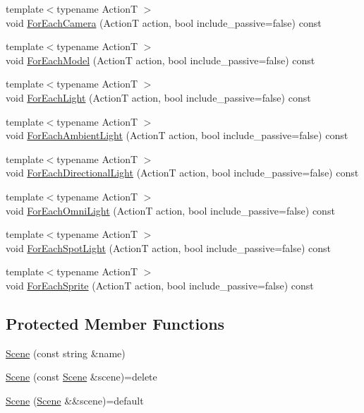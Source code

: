 \begin{DoxyCompactItemize}
\item 
{\footnotesize template$<$typename ActionT $>$ }\\void \hyperlink{classmage_1_1_scene_a196159c991332f06faaee3c6ce0ff780}{For\+Each\+Camera} (ActionT action, bool include\+\_\+passive=false) const
\item 
{\footnotesize template$<$typename ActionT $>$ }\\void \hyperlink{classmage_1_1_scene_a6df0662b829691415f50ea1d45341582}{For\+Each\+Model} (ActionT action, bool include\+\_\+passive=false) const
\item 
{\footnotesize template$<$typename ActionT $>$ }\\void \hyperlink{classmage_1_1_scene_a7ef0664366aa29c4dff89329d3fb5759}{For\+Each\+Light} (ActionT action, bool include\+\_\+passive=false) const
\item 
{\footnotesize template$<$typename ActionT $>$ }\\void \hyperlink{classmage_1_1_scene_a0b05bd65003dfb02124dd00762950a16}{For\+Each\+Ambient\+Light} (ActionT action, bool include\+\_\+passive=false) const
\item 
{\footnotesize template$<$typename ActionT $>$ }\\void \hyperlink{classmage_1_1_scene_ab1b4131911bf2457707fae459d999f85}{For\+Each\+Directional\+Light} (ActionT action, bool include\+\_\+passive=false) const
\item 
{\footnotesize template$<$typename ActionT $>$ }\\void \hyperlink{classmage_1_1_scene_a9dae59b09d5167d027fc4cf8f09b961c}{For\+Each\+Omni\+Light} (ActionT action, bool include\+\_\+passive=false) const
\item 
{\footnotesize template$<$typename ActionT $>$ }\\void \hyperlink{classmage_1_1_scene_af7419b0edf8a0cae6b113d18231a910a}{For\+Each\+Spot\+Light} (ActionT action, bool include\+\_\+passive=false) const
\item 
{\footnotesize template$<$typename ActionT $>$ }\\void \hyperlink{classmage_1_1_scene_af33b14f081e0b3ae5dafc807bb6bf5b4}{For\+Each\+Sprite} (ActionT action, bool include\+\_\+passive=false) const
\end{DoxyCompactItemize}
\subsection*{Protected Member Functions}
\begin{DoxyCompactItemize}
\item 
\hyperlink{classmage_1_1_scene_aab61b38547fc53aa9c5b3b559f4d2e26}{Scene} (const string \&name)
\item 
\hyperlink{classmage_1_1_scene_a88d83ccb2e10549d5370f850b2b4c228}{Scene} (const \hyperlink{classmage_1_1_scene}{Scene} \&scene)=delete
\item 
\hyperlink{classmage_1_1_scene_a35b8fc4242c2348e53014b96416fc3d3}{Scene} (\hyperlink{classmage_1_1_scene}{Scene} \&\&scene)=default
\end{DoxyCompactItemize}
